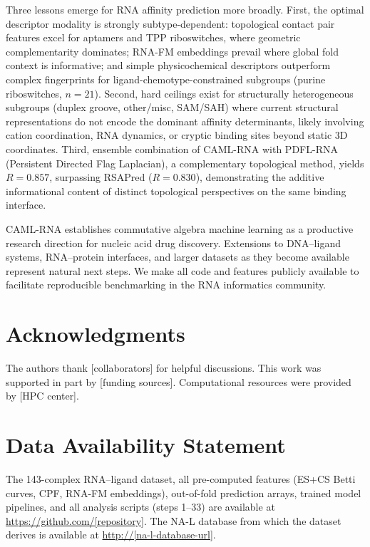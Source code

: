 \documentclass[10pt,twocolumn]{article}
\begin{document}
Three lessons emerge for RNA affinity prediction more broadly.
First, the optimal descriptor modality is strongly subtype-dependent:
topological contact pair features excel for aptamers and TPP riboswitches,
where geometric complementarity dominates; RNA-FM embeddings prevail where
global fold context is informative; and simple physicochemical descriptors
outperform complex fingerprints for ligand-chemotype-constrained subgroups
(purine riboswitches, $n=21$).
Second, hard ceilings exist for structurally heterogeneous subgroups
(duplex groove, other/misc, SAM/SAH) where current structural representations
do not encode the dominant affinity determinants, likely involving cation
coordination, RNA dynamics, or cryptic binding sites beyond static 3D
coordinates.
Third, ensemble combination of CAML-RNA with PDFL-RNA (Persistent Directed
Flag Laplacian), a complementary topological method, yields $R = 0.857$,
surpassing RSAPred ($R = 0.830$), demonstrating the additive informational
content of distinct topological perspectives on the same binding interface.

CAML-RNA establishes commutative algebra machine learning as a productive
research direction for nucleic acid drug discovery.
Extensions to DNA--ligand systems, RNA--protein interfaces, and larger datasets
as they become available represent natural next steps.
We make all code and features publicly available to facilitate reproducible
benchmarking in the RNA informatics community.


\section*{Acknowledgments}

The authors thank [collaborators] for helpful discussions.
This work was supported in part by [funding sources].
Computational resources were provided by [HPC center].

\section*{Data Availability Statement}

The 143-complex RNA--ligand dataset, all pre-computed features (ES+CS Betti curves,
CPF, RNA-FM embeddings), out-of-fold prediction arrays, trained model pipelines,
and all analysis scripts (steps 1--33) are available at
\url{https://github.com/[repository]}.
The NA-L database from which the dataset derives is available at
\url{http://[na-l-database-url]}.
\end{document}
